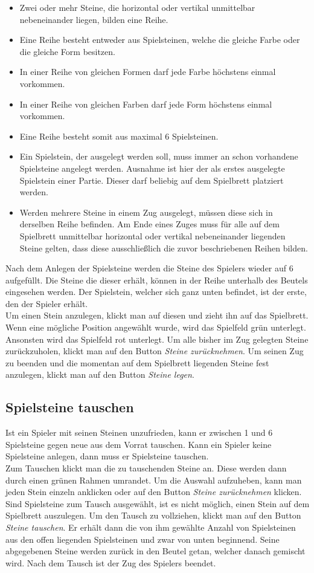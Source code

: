\documentclass[a4paper, ngerman]{scrartcl}
\begin{document}
\begin{itemize}
\item Zwei oder mehr Steine, die horizontal oder vertikal unmittelbar nebeneinander liegen, bilden eine Reihe.
\item Eine Reihe besteht entweder aus Spielsteinen, welche die gleiche Farbe oder die gleiche Form besitzen.
\item In einer Reihe von gleichen Formen darf jede Farbe höchstens einmal vorkommen.
\item In einer Reihe von gleichen Farben darf jede Form höchstens einmal vorkommen.
\item Eine Reihe besteht somit aus maximal 6 Spielsteinen.
\item Ein Spielstein, der ausgelegt werden soll, muss immer an schon vorhandene Spielsteine angelegt werden. Ausnahme ist hier der als erstes ausgelegte Spielstein einer Partie. Dieser darf beliebig auf dem Spielbrett platziert werden.
\item Werden mehrere Steine in einem Zug ausgelegt, müssen diese sich in derselben Reihe befinden. Am Ende eines Zuges muss für alle auf dem Spielbrett unmittelbar horizontal oder vertikal nebeneinander liegenden Steine gelten, dass diese ausschließlich die zuvor beschriebenen Reihen bilden.
\end{itemize}

Nach dem Anlegen der Spielsteine werden die Steine des Spielers wieder auf 6 aufgefüllt. Die Steine die dieser erhält, können in der Reihe unterhalb des Beutels eingesehen werden. Der Spielstein, welcher sich ganz unten befindet, ist der erste, den der Spieler erhält.\\
Um einen Stein anzulegen, klickt man auf diesen und zieht ihn auf das Spielbrett. Wenn eine mögliche Position angewählt wurde, wird das Spielfeld grün unterlegt. Ansonsten wird das Spielfeld rot unterlegt. Um alle bisher im Zug gelegten Steine zurückzuholen, klickt man auf den Button \emph{Steine zurücknehmen}. Um seinen Zug zu beenden und die momentan auf dem Spielbrett liegenden Steine fest anzulegen, klickt man auf den Button \emph{Steine legen}.
	 
\subsection{Spielsteine tauschen}
Ist ein Spieler mit seinen Steinen unzufrieden, kann er zwischen 1 und 6 Spielsteine gegen neue aus dem Vorrat tauschen. Kann ein Spieler keine Spielsteine anlegen, dann muss er Spielsteine tauschen.\\
Zum Tauschen klickt man die zu tauschenden Steine an. Diese werden dann durch einen grünen Rahmen umrandet. Um die Auswahl aufzuheben, kann man jeden Stein einzeln anklicken oder auf den Button \emph{Steine zurücknehmen} klicken. Sind Spielsteine zum Tausch ausgewählt, ist es nicht möglich, einen Stein auf dem Spielbrett auszulegen. Um den Tausch zu vollziehen, klickt man auf den Button \emph{Steine tauschen}.
 Er erhält dann die von ihm gewählte Anzahl von Spielsteinen aus den offen liegenden Spielsteinen und zwar von unten beginnend. Seine abgegebenen Steine werden zurück in den Beutel getan, welcher danach gemischt wird.
 Nach dem Tausch ist der Zug des Spielers beendet.
	
\end{document}
